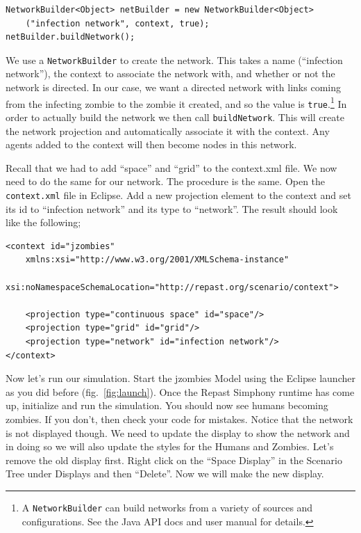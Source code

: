 \documentclass[11pt]{amsart}
\begin{document}
\noindent\begin{minipage}[h]{\textwidth}
\vspace{.2in}
\lstset{language=java,caption=}
\begin{lstlisting}
NetworkBuilder<Object> netBuilder = new NetworkBuilder<Object>
	("infection network", context, true);
netBuilder.buildNetwork();
\end{lstlisting}
\vspace{.2in}
\end{minipage}

We use a \texttt{NetworkBuilder} to create the network. This takes a name (``infection network''), the context to associate the network with, and whether or not the network is directed. In our case, we want a directed network with links coming from the infecting zombie to the zombie it created, and so the value is \texttt{true}.\footnote{A \texttt{NetworkBuilder} can build networks from a variety of sources and configurations. See the Java API docs and user manual for details.} In order to actually build the network we then call \texttt{buildNetwork}. This will create the network projection and automatically associate it with the context. Any agents added to the context will then become nodes in this network.

Recall that we had to add ``space'' and ``grid'' to the context.xml file. We now need to do the same for our network. The procedure is the same. Open the \texttt{context.xml} file in Eclipse. Add a new projection element to the context and set its id to ``infection network'' and its type to ``network''. The result should look like the following;

\noindent\begin{minipage}[h]{\textwidth}
\vspace{.2in}
\lstset{language=java,caption=}
\begin{lstlisting}
<context id="jzombies"
	xmlns:xsi="http://www.w3.org/2001/XMLSchema-instance"
	xsi:noNamespaceSchemaLocation="http://repast.org/scenario/context">
	
	<projection type="continuous space" id="space"/>
	<projection type="grid" id="grid"/>
	<projection type="network" id="infection network"/>
</context>

\end{lstlisting}
\vspace{.2in}
\end{minipage}

Now let's run our simulation. Start the jzombies Model using the Eclipse launcher as you did before (fig.~\ref{fig:launch}). Once the Repast Simphony runtime has come up, initialize and run the simulation. You should now see humans becoming zombies. If you don't, then check your code for mistakes. Notice that the network is not displayed though. We need to update the display to show the network and in doing so we will also update the styles for the Humans and Zombies. Let's remove the old display first. Right click on the ``Space Display'' in the Scenario Tree under Displays and then ``Delete''. Now we will make the new display.
\end{document}
